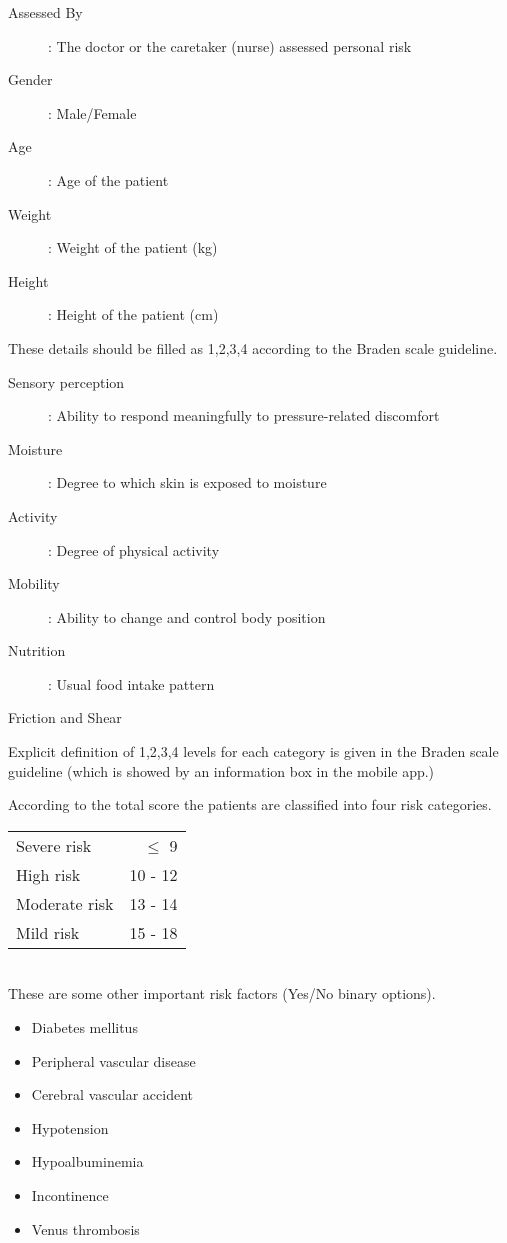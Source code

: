 \begin{description}
	\item[Assessed By]: The doctor or the caretaker (nurse) assessed personal risk
	\item[Gender]: Male/Female
	\item[Age]: Age of the patient
	\item[Weight]: Weight of the patient (kg)
	\item[Height]: Height of the patient (cm)    
\end{description}

These details should be filled as 1,2,3,4 according to the Braden scale guideline. 

\begin{description}
	\item[Sensory perception]: Ability to respond meaningfully to pressure-related discomfort 
	\item[Moisture]: Degree to which skin is exposed to moisture 
	\item[Activity]: Degree of physical	activity 
	\item[Mobility]: Ability to change and control body position
	\item[Nutrition]: Usual food intake 	pattern 
	\item[Friction and Shear]     
\end{description}

Explicit definition of 1,2,3,4 levels for each category is given in the Braden scale guideline (which is showed by an information box in the mobile app.)

According to the total score the patients are classified into four risk categories.


\begin{tabular}{l r}
	Severe risk &  $\leq$ 9\\
	High risk &  10 - 12\\
	Moderate risk & 13 - 14\\
	Mild risk &  15 - 18 \\
\end{tabular}\\

These are some other important risk factors (Yes/No binary options). 

\begin{itemize}
	\item Diabetes mellitus
	\item Peripheral vascular disease
	\item Cerebral vascular accident
	\item Hypotension
	\item Hypoalbuminemia
	\item Incontinence
	\item Venus thrombosis	
\end{itemize}


